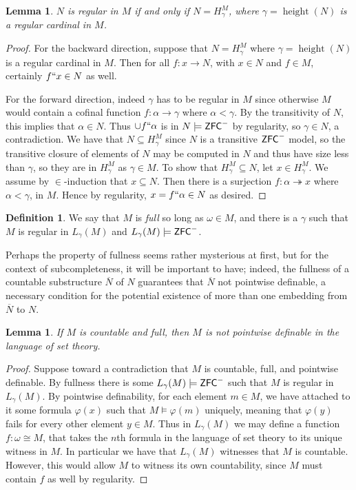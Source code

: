 \documentclass{amsart}
\newtheorem{lemma}[theorem]{Lemma}
\theoremstyle{definition}
\newtheorem{definition}[theorem]{Definition}
\theoremstyle{remark}
\newcommand{\N}{{\overline{N}}}
\newcommand{\ZFC}{\textup{\ensuremath{\textsf{ZFC}}}}
\DeclareMathOperator{\height}{height}
\newcommand{\To}{\longrightarrow}
\begin{document}
\begin{lemma} \label{lemma:regularityequiv}
$N$ is regular in $M$ if and only if $N = H_\gamma^M$, where $\gamma = \height(N)$ is a regular cardinal in $M$. 
\end{lemma}
\begin{proof}
For the backward direction, suppose that $N=H_\gamma^M$ where $\gamma = \height(N)$ is a regular cardinal in $M$. Then for all $f: x \To N$, with $x \in N$ and $f \in M$, certainly $f``x \in N$ as well.

For the forward direction, indeed $\gamma$ has to be regular in $M$ since otherwise $M$ would contain a cofinal function $f: \alpha \To \gamma$ where $\alpha < \gamma$. By the transitivity of $N$, this implies that $\alpha \in N$. Thus $\cup f``\alpha$ is in $N \models \ZFC^-$ by regularity, so $\gamma \in N$, a contradiction.
We have that $N \subseteq H_{\gamma}^M$ since $N$ is a transitive $\ZFC^-$ model, so the transitive closure of elements of $N$ may be computed in $N$ and thus have size less than $\gamma$, so they are in $H_\gamma^M$ as $\gamma \in M$. To show that $H_{\gamma}^M \subseteq N$, let $x \in H_{\gamma}^M$. We assume by $\in$-induction that $x \subseteq N$. Then there is a surjection $f: \alpha \twoheadrightarrow x$ where $\alpha < \gamma$, in $M$. Hence by regularity, $x = f``\alpha \in N$ as desired.
\end{proof}

\begin{definition} We say that $M$ is \emph{full} so long as $\omega \in M$, and there is a $\gamma$ such that $M$ is regular in $L_\gamma(M)$ and $L_\gamma(M) \models \ZFC^-$.
\end{definition}

Perhaps the property of fullness seems rather mysterious at first, but for the context of subcompleteness, it will be important to have; indeed, the fullness of a countable substructure $\N$ of $N$ guarantees that $\N$ not pointwise definable, a necessary condition for the potential existence
of more than one embedding from $\N$ to $N$.

\begin{lemma} If $M$ is countable and full, then $M$ is not pointwise definable in the language of set theory. \end{lemma}
\begin{proof} Suppose toward a contradiction that $M$ is countable, full, and pointwise definable. By fullness there is some $L_\gamma(M) \models \ZFC^-$ such that $M$ is regular in $L_\gamma(M)$. By pointwise definability, for each element $m \in M$, we have attached to it some formula $\varphi(x)$ such that $M \models \varphi(m)$ uniquely, meaning that $\varphi(y)$ fails for every other element $y \in M$. Thus in $L_\gamma(M)$ we may define a function $f: \omega \cong M$, that takes the $n$th formula in the language of set theory to its unique witness in $M$. In particular we have that $L_\gamma(M)$ witnesses that $M$ is countable. However, this would allow $M$ to witness its own countability, since $M$ must contain $f$ as well by regularity. \end{proof} 
\end{document}
